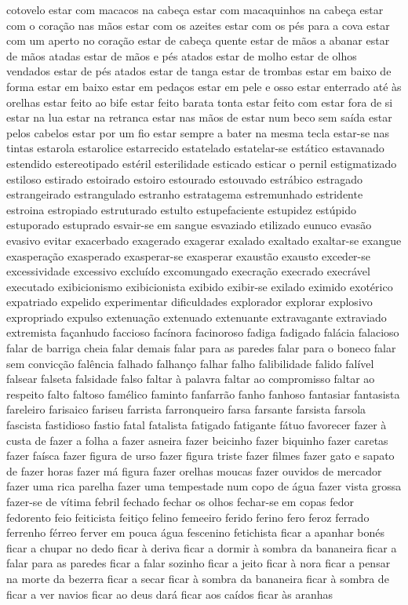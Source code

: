 \documentclass[ruledheader]{abnt_UFF}
\begin{document}
cotovelo estar com macacos na cabe\c{c}a estar com macaquinhos na cabe\c{c}a estar com o cora\c{c}\~ao nas m\~aos estar com os azeites estar com os p\'{e}s para a cova estar com um aperto no cora\c{c}\~ao estar de cabe\c{c}a quente estar de m\~aos a abanar estar de m\~aos atadas estar de m\~aos e p\'{e}s atados estar de molho estar de olhos vendados estar de p\'{e}s atados estar de tanga estar de trombas estar em baixo de forma estar em baixo estar em peda\c{c}os estar em pele e osso estar enterrado at\'{e} \`{a}s orelhas estar feito ao bife estar feito barata tonta estar feito com estar fora de si estar na lua estar na retranca estar nas m\~aos de estar num beco sem sa\'{i}da estar pelos cabelos estar por um fio estar sempre a bater na mesma tecla estar-se nas tintas estarola estarolice estarrecido estatelado estatelar-se est\'{a}tico estavanado estendido estereotipado est\'{e}ril esterilidade esticado esticar o pernil estigmatizado estiloso estirado estoirado estoiro estourado estouvado estr\'{a}bico estragado estrangeirado estrangulado estranho estratagema estremunhado estridente estroina estropiado estruturado estulto estupefaciente estupidez est\'{u}pido estuporado estuprado esvair-se em sangue esvaziado etilizado eunuco evas\~ao evasivo evitar exacerbado exagerado exagerar exalado exaltado exaltar-se exangue exaspera\c{c}\~ao exasperado exasperar-se exasperar exaust\~ao exausto exceder-se excessividade excessivo exclu\'{i}do excomungado execra\c{c}\~ao execrado execr\'{a}vel executado exibicionismo exibicionista exibido exibir-se exilado eximido exot\'{e}rico expatriado expelido experimentar dificuldades explorador explorar explosivo expropriado expulso extenua\c{c}\~ao extenuado extenuante extravagante extraviado extremista fa\c{c}anhudo faccioso fac\'{i}nora facinoroso fadiga fadigado fal\'{a}cia falacioso falar de barriga cheia falar demais falar para as paredes falar para o boneco falar sem convic\c{c}\~ao fal\^{e}ncia falhado falhan\c{c}o falhar falho falibilidade falido fal\'{i}vel falsear falseta falsidade falso faltar \`{a} palavra faltar ao compromisso faltar ao respeito falto faltoso fam\'{e}lico faminto fanfarr\~ao fanho fanhoso fantasiar fantasista fareleiro farisaico fariseu farrista farronqueiro farsa farsante farsista farsola fascista fastidioso fastio fatal fatalista fatigado fatigante f\'{a}tuo favorecer fazer \`{a} custa de fazer a folha a fazer asneira fazer beicinho fazer biquinho fazer caretas fazer fa\'{i}sca fazer figura de urso fazer figura triste fazer filmes fazer gato e sapato de fazer horas fazer m\'{a} figura fazer orelhas moucas fazer ouvidos de mercador fazer uma rica parelha fazer uma tempestade num copo de \'{a}gua fazer vista grossa fazer-se de v\'{i}tima febril fechado fechar os olhos fechar-se em copas fedor fedorento feio feiticista feiti\c{c}o felino femeeiro ferido ferino fero feroz ferrado ferrenho f\'{e}rreo ferver em pouca \'{a}gua fescenino fetichista ficar a apanhar bon\'{e}s ficar a chupar no dedo ficar \`{a} deriva ficar a dormir \`{a} sombra da bananeira ficar a falar para as paredes ficar a falar sozinho ficar a jeito ficar \`{a} nora ficar a pensar na morte da bezerra ficar a secar ficar \`{a} sombra da bananeira ficar \`{a} sombra de ficar a ver navios ficar ao deus dar\'{a} ficar aos ca\'{i}dos ficar \`{a}s aranhas 
\end{document}
